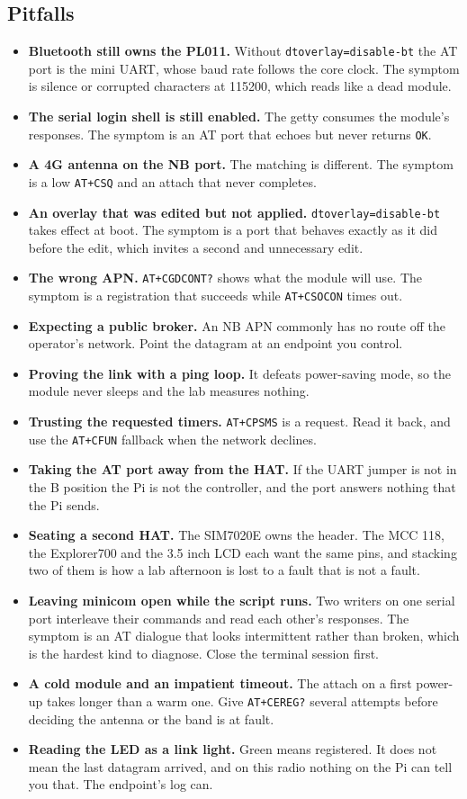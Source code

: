 \subsection*{Pitfalls}

\begin{itemize}
\item \textbf{Bluetooth still owns the PL011.} Without \texttt{dtoverlay=disable-bt} the AT port is the mini UART, whose baud rate follows the core clock. The symptom is silence or corrupted characters at 115200, which reads like a dead module.
\item \textbf{The serial login shell is still enabled.} The getty consumes the module's responses. The symptom is an AT port that echoes but never returns \texttt{OK}.
\item \textbf{A 4G antenna on the NB port.} The matching is different. The symptom is a low \texttt{AT+CSQ} and an attach that never completes.
\item \textbf{An overlay that was edited but not applied.} \texttt{dtoverlay=disable-bt} takes effect at boot. The symptom is a port that behaves exactly as it did before the edit, which invites a second and unnecessary edit.
\item \textbf{The wrong APN.} \texttt{AT+CGDCONT?} shows what the module will use. The symptom is a registration that succeeds while \texttt{AT+CSOCON} times out.
\item \textbf{Expecting a public broker.} An NB APN commonly has no route off the operator's network. Point the datagram at an endpoint you control.
\item \textbf{Proving the link with a ping loop.} It defeats power-saving mode, so the module never sleeps and the lab measures nothing.
\item \textbf{Trusting the requested timers.} \texttt{AT+CPSMS} is a request. Read it back, and use the \texttt{AT+CFUN} fallback when the network declines.
\item \textbf{Taking the AT port away from the HAT.} If the UART jumper is not in the B position the Pi is not the controller, and the port answers nothing that the Pi sends.
\item \textbf{Seating a second HAT.} The SIM7020E owns the header. The MCC 118, the Explorer700 and the 3.5 inch LCD each want the same pins, and stacking two of them is how a lab afternoon is lost to a fault that is not a fault.
\item \textbf{Leaving minicom open while the script runs.} Two writers on one serial port interleave their commands and read each other's responses. The symptom is an AT dialogue that looks intermittent rather than broken, which is the hardest kind to diagnose. Close the terminal session first.
\item \textbf{A cold module and an impatient timeout.} The attach on a first power-up takes longer than a warm one. Give \texttt{AT+CEREG?} several attempts before deciding the antenna or the band is at fault.
\item \textbf{Reading the LED as a link light.} Green means registered. It does not mean the last datagram arrived, and on this radio nothing on the Pi can tell you that. The endpoint's log can.
\end{itemize}

